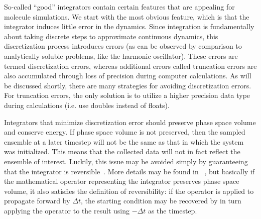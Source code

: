 \documentclass[9pt,bestpractices]{livecoms}
\begin{document}
So-called ``good'' integrators contain certain features that are appealing for molecule simulations.
We start with the most obvious feature, which is that the integrator induces little error in the dynamics.
Since integration is fundamentally about taking discrete steps to approximate continuous dynamics, this discretization process introduces errors (as can be observed by comparison to analytically soluble problems, like the harmonic oscillator).
These errors are termed discretization errors, whereas additional errors called truncation errors are also accumulated through loss of precision during computer calculations.
As will be discussed shortly, there are many strategies for avoiding discretization errors.
For truncation errors, the only solution is to utilize a higher precision data type during calculations (i.e. use doubles instead of floats).

Integrators that minimize discretization error should preserve phase space volume and conserve energy.
If phase space volume is not preserved, then the sampled ensemble at a later timestep will not be the same as that in which the system was initialized.
This means that the collected data will not in fact reflect the ensemble of interest.
Luckily, this issue may be avoided simply by guaranteeing that the integrator is reversible~\cite{Frenkel:2001:}.
More details may be found in ~\citet{Tuckerman:1992:}, but basically if the mathematical operator representing the integrator preserves phase space volume, it also satisfies the definition of reversibility: if the operator is applied to propagate forward by $\Delta t$, the starting condition may be recovered by in turn applying the operator to the result using $- \Delta t$ as the timestep.
\end{document}

